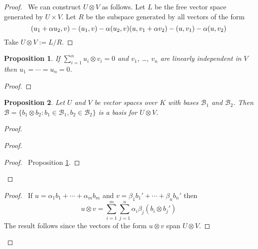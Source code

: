 \documentclass{book}
\let\qed\relax
\newtheorem{prop}{Proposition}[chapter]
\theoremstyle{definition}
\begin{document}
\begin{proof}
\pf\ We can construct $U \otimes V$ as follows. Let $L$ be the free vector space generated by $U \times V$. Let $R$ be the subspace generated by all vectors of the form
\begin{equation*}
(u_1 + \alpha u_2, v) - (u_1,v) - \alpha (u_2,v) \\
(u, v_1 + \alpha v_2) - (u,v_1) - \alpha (u,v_2)
\end{equation*}
Take $U \otimes V := L / R$. \qed
\end{proof}

\begin{prop}
\label{prop:linearly-disjoint}
If $\sum_{i=1}^n u_i \otimes v_i = 0$ and $v_1$, \ldots, $v_n$ are linearly independent in $V$ then $u_1 = \cdots = u_n = 0$.
\end{prop}

\begin{proof}
\pf
{}
\qed
\end{proof}

\begin{prop}
Let $U$ and $V$ be vector spaces over $K$ with bases $\mathcal{B}_1$ and $\mathcal{B}_2$. Then $\mathcal{B} = \{ b_1 \otimes b_2 : b_1 \in \mathcal{B}_1, b_2 \in \mathcal{B}_2 \}$ is a basis for $U \otimes V$.
\end{prop}

\begin{proof}
\pf
{}
\begin{proof}
	\begin{proof}
		\pf\ Proposition \ref{prop:linearly-disjoint}.
	\end{proof}
\end{proof}
\begin{proof}
	\pf\ If $u = \alpha_1 b_1 + \cdots + \alpha_m b_m$ and $v = \beta_1 b_1' + \cdots + \beta_n b_n'$ then
	\[ u \otimes v = \sum_{i=1}^m \sum_{j=1}^n \alpha_i \beta_j (b_i \otimes b_j') \]
	The result follows since the vectors of the form $u \otimes v$ span $U \otimes V$.
\end{proof}
\qed
\end{proof}
\end{document}
